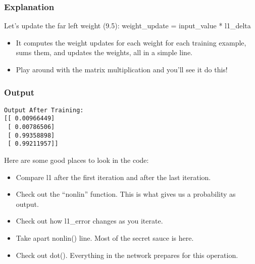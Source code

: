 \begin{frame}[fragile] \frametitle{Explanation}
Let's update the far left weight (9.5): weight\_update = input\_value * l1\_delta
\begin{itemize}
\item It computes the weight updates for each weight for each training example, sums them, and updates the weights, all in a simple line. 
\item Play around with the matrix multiplication and you'll see it do this! 
\end{itemize}
\end{frame}

\begin{frame}[fragile] \frametitle{Output}
\begin{lstlisting}
Output After Training:
[[ 0.00966449]
 [ 0.00786506]
 [ 0.99358898]
 [ 0.99211957]]
\end{lstlisting}

Here are some good places to look in the code: 
\begin{itemize}
\item Compare l1 after the first iteration and after the last iteration.
\item Check out the ``nonlin'' function. This is what gives us a probability as output.
\item Check out how l1\_error changes as you iterate.
\item Take apart nonlin() line. Most of the secret sauce is here.
\item Check out dot(). Everything in the network prepares for this operation. 
\end{itemize}
\end{frame}


